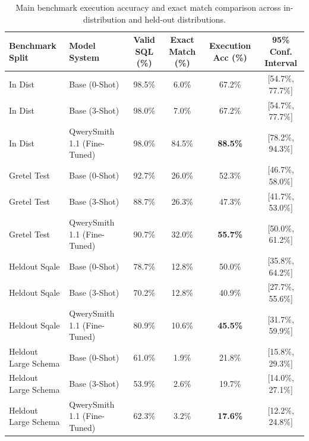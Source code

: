 \begin{table}[t]
\centering\small
\begin{tabular}{llcccc}
\toprule
\textbf{Benchmark Split} & \textbf{Model System} & \textbf{Valid SQL (\%)} & \textbf{Exact Match (\%)} & \textbf{Execution Acc (\%)} & \textbf{95\% Conf. Interval} \\
\midrule
In Dist & Base (0-Shot) & 98.5\% & 6.0\% & 67.2\% & [54.7\%, 77.7\%] \\
In Dist & Base (3-Shot) & 98.0\% & 7.0\% & 67.2\% & [54.7\%, 77.7\%] \\
In Dist & QwerySmith 1.1 (Fine-Tuned) & 98.0\% & 84.5\% & \textbf{88.5\%} & [78.2\%, 94.3\%] \\
\midrule
Gretel Test & Base (0-Shot) & 92.7\% & 26.0\% & 52.3\% & [46.7\%, 58.0\%] \\
Gretel Test & Base (3-Shot) & 88.7\% & 26.3\% & 47.3\% & [41.7\%, 53.0\%] \\
Gretel Test & QwerySmith 1.1 (Fine-Tuned) & 90.7\% & 32.0\% & \textbf{55.7\%} & [50.0\%, 61.2\%] \\
\midrule
Heldout Sqale & Base (0-Shot) & 78.7\% & 12.8\% & 50.0\% & [35.8\%, 64.2\%] \\
Heldout Sqale & Base (3-Shot) & 70.2\% & 12.8\% & 40.9\% & [27.7\%, 55.6\%] \\
Heldout Sqale & QwerySmith 1.1 (Fine-Tuned) & 80.9\% & 10.6\% & \textbf{45.5\%} & [31.7\%, 59.9\%] \\
\midrule
Heldout Large Schema & Base (0-Shot) & 61.0\% & 1.9\% & 21.8\% & [15.8\%, 29.3\%] \\
Heldout Large Schema & Base (3-Shot) & 53.9\% & 2.6\% & 19.7\% & [14.0\%, 27.1\%] \\
Heldout Large Schema & QwerySmith 1.1 (Fine-Tuned) & 62.3\% & 3.2\% & \textbf{17.6\%} & [12.2\%, 24.8\%] \\
\midrule
\bottomrule
\end{tabular}
\caption{Main benchmark execution accuracy and exact match comparison across in-distribution and held-out distributions.}
\label{tab:main_benchmark}
\end{table}
